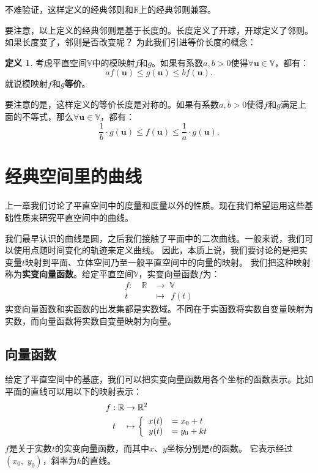\documentclass[12pt,UTF8]{ctexbook}
\theoremstyle{definition}
\newtheorem{df}{定义}[section]
\theoremstyle{plain}
\begin{document}
不难验证，这样定义的经典邻则和$\mathbb{R}$上的经典邻则兼容。

要注意，以上定义的经典邻则是基于长度的。长度定义了开球，开球定义了邻则。如果长度变了，邻则是否改变呢？
为此我们引进等价长度的概念：
\begin{df}
    考虑平直空间$\mathbb{V}$中的模映射$f$和$g$。如果有系数$a,b>0$使得$\forall \mathbf{u} \in \mathbb{V}$，都有：
    $$ af(\mathbf{u}) \leqslant g(\mathbf{u}) \leqslant bf(\mathbf{u}).$$
    就说模映射$f$和$g$\textbf{等价}。
\end{df}
要注意的是，这样定义的等价长度是对称的。如果有系数$a,b>0$使得$f$和$g$满足上面的不等式，那么$\forall \mathbf{u} \in \mathbb{V}$，都有：
$$ \frac{1}{b}\cdot g(\mathbf{u}) \leqslant f(\mathbf{u}) \leqslant \frac{1}{a}\cdot g(\mathbf{u}). $$


\chapter{经典空间里的曲线}

上一章我们讨论了平直空间中的度量和度量以外的性质。现在我们希望运用这些基础性质来研究平直空间中的曲线。

我们最早认识的曲线是圆，之后我们接触了平面中的二次曲线。一般来说，我们可以使用点随时间变化的轨迹来定义曲线。
因此，本质上说，我们要讨论的是把实变量$t$映射到平面、立体空间乃至一般平直空间中的向量的映射。
我们把这种映射称为\textbf{实变向量函数}。给定平直空间$\mathbb{V}$，实变向量函数$f$为：
\begin{align*}
    f: \quad \mathbb{R} &\rightarrow \; \mathbb{V} \\
      t \; &\mapsto \;\,f(t)
\end{align*}
实变向量函数和实函数的出发集都是实数域。不同在于实函数将实数自变量映射为实数，而向量函数将实数自变量映射为向量。

\section{向量函数}

给定了平直空间中的基底，我们可以把实变向量函数用各个坐标的函数表示。比如平面的直线可以用以下的映射表示：
\begin{align*}
    f: \mathbb{R} &\rightarrow \mathbb{R}^2 \\
    t\quad &\mapsto\left\{
        \begin{array}[]{rl}
            x(t) &= x_0 + t \\
            y(t) &= y_0 + kt \\
        \end{array}
    \right.
\end{align*}
$f$是关于实数$t$的实变向量函数，而其中$x$、$y$坐标分别是$t$的函数。
它表示经过$(x_0,\,\, y_0)$，斜率为$k$的直线。
\end{document}
